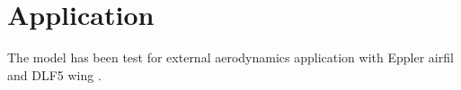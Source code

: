 %
\chapter{Application}

The model has been test for external aerodynamics application with Eppler airfil \cite{e387Exp} and DLF5 wing \citep{DLR-F5}.

\pagebreak
%
